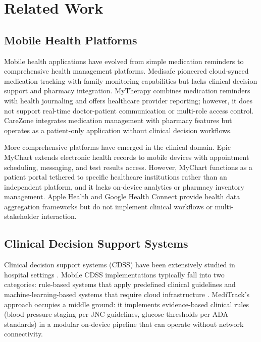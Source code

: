 \documentclass[journal,onecolumn,web]{ieeecolor}
\begin{document}
\section{Related Work}
\label{sec:related}

\subsection{Mobile Health Platforms}
Mobile health applications have evolved from simple
medication reminders to comprehensive health management
platforms. Medisafe \cite{medisafe} pioneered
cloud-synced medication tracking with family monitoring
capabilities but lacks clinical decision support and
pharmacy integration. MyTherapy \cite{mytherapy}
combines medication reminders with health journaling
and offers healthcare provider reporting; however, it
does not support real-time doctor-patient communication
or multi-role access control. CareZone \cite{carezone}
integrates medication management with pharmacy features
but operates as a patient-only application without
clinical decision workflows.

More comprehensive platforms have emerged in the
clinical domain. Epic MyChart \cite{mychart} extends
electronic health records to mobile devices with
appointment scheduling, messaging, and test results
access. However, MyChart functions as a patient portal
tethered to specific healthcare institutions rather
than an independent platform, and it lacks on-device
analytics or pharmacy inventory management. Apple
Health \cite{applehealth} and Google Health
Connect \cite{healthconnect} provide health data
aggregation frameworks but do not implement clinical
workflows or multi-stakeholder interaction.

\subsection{Clinical Decision Support Systems}
Clinical decision support systems (CDSS) have been
extensively studied in hospital
settings \cite{middleton2016}. Mobile CDSS
implementations typically fall into two categories:
rule-based systems that apply predefined clinical
guidelines \cite{garg2005} and machine-learning-based
systems that require cloud
infrastructure \cite{topol2019}. MediTrack's approach
occupies a middle ground: it implements evidence-based
clinical rules (blood pressure staging per JNC
guidelines, glucose thresholds per ADA standards) in a
modular on-device pipeline that can operate without
network connectivity.
\end{document}
